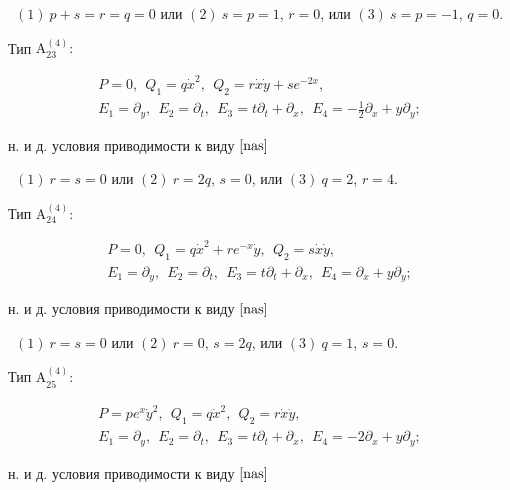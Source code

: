 \begin{thms}
\ $(1)\ p+s=r=q=0$ или $(2)\ s=p=1$, $r=0$, или $(3) \ s=p=-1$, $q=0$.





Тип $\mathrm{A^{(4)}_{23}}{:}$


\begin{gather*}


P=0,\ \ Q_1=q\Dot x^2,\ \ Q_2=r\Dot x\Dot y+se^{-2x},\\


E_1=\partial_y,\ \ E_2=\partial_ t,\ \ E_3=t\partial_t+\partial_x,


\ \ E_4=-\frac12\partial_x+y\partial_y;


\end{gather*}


н. и д. условия приводимости к виду $\eqref{nas}$


\ $(1)\ r=s=0$ или $(2)\ r=2q$, $s=0$, или $(3)\ q=2$, $r=4$.





Тип $\mathrm{A^{(4)}_{24}}{:}$


\begin{gather*}


P=0,\ \ Q_1=q\Dot x^2+re^{-x}\Dot y,\ \ Q_2=s\Dot x\Dot y,\\


E_1=\partial_y,\ \ E_2=\partial_ t,\ \ E_3=t\partial_t+\partial_x,


\ \ E_4=\partial_x+y\partial_y;


\end{gather*}


н. и д. условия приводимости к виду $\eqref{nas}$


\ $(1)\ r=s=0$ или $(2)\ r=0$, $s=2q$, или $(3)\ q=1$, $s=0$.





Тип $\mathrm{A^{(4)}_{25}}{:}$


\begin{gather*}


P=pe^x\Dot y^2,\ \ Q_1=q\Dot x^2,\ \  Q_2=r\Dot x\Dot y,\\


E_1=\partial_y,\ \ E_2=\partial_ t,\ \ E_3=t\partial_t+\partial_x,


\ \ E_4=-2\partial_x+y\partial_y;


\end{gather*}


н. и д. условия приводимости к виду $\eqref{nas}$



\end{thms}
